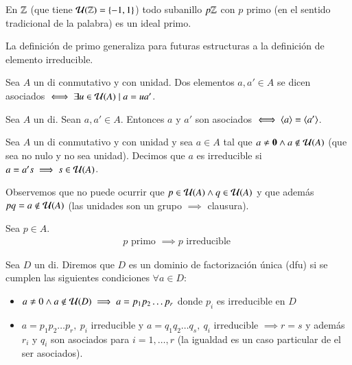 \begin{ej}
	En $\mathbb{Z}$ (que tiene $\mathcal{U}(\mathbb{Z}) = \{-1, 1\}$) todo subanillo $p\mathbb{Z}$ con $p$ primo (en el sentido tradicional de la palabra) es un ideal primo.
\end{ej}

La definición de primo generaliza para futuras estructuras a la definición de elemento irreducible.

\begin{dfn}
	Sea $A$ un \gls{di} conmutativo y con unidad. Dos elementos $a,a' \in A$ se dicen asociados $\iff \exists u \in \mathcal{U}(A) \mid a = ua'$.
\end{dfn}

\begin{pro}
	Sea $A$ un \gls{di}. Sean $a,a' \in A$. Entonces $a$ y $a'$ son asociados $\iff \langle a\rangle = \langle a'\rangle$.
\end{pro}

\begin{dfn}
	Sea $A$ un \gls{di} conmutativo y con unidad y sea $a \in A$ tal que $a \neq \mathbf{0} \land a \notin \mathcal{U}(A)$ (que sea no nulo y no sea unidad). Decimos que $a$ es irreducible si $a = a's \implies s \in \mathcal{U}(A)$.
\end{dfn}

Observemos que no puede ocurrir que $p \in \mathcal{U}(A) \land q \in \mathcal{U}(A)$ y que además $pq = a \notin \mathcal{U}(A)$ (las unidades son un grupo $\implies$ clausura).


\begin{pro}
	Sea $p \in A$.
	\begin{align*}
		p \text{ primo } \implies p \text{ irreducible }
	\end{align*}
\end{pro}

\begin{dfn}
	\label{dfn:dfu}
	Sea $D$ un \gls{di}. Diremos que $D$ es un dominio de factorización única (\gls{dfu}) si se cumplen las siguientes condiciones $\forall a \in D$:
	\begin{itemize}
		\item $a \neq 0 \land a \not\in\mathcal{U}(D) \implies a = p_1p_2\dots p_r$ donde $p_i$ es irreducible en $D$
		\item $a = p_1p_2\dots p_r,\ p_i$ irreducible y $a = q_1q_2 \dots q_s,\ q_i$ irreducible $\implies r = s$ y además $r_i$ y $q_i$ son asociados para $i = 1, \dots, r$ (la igualdad es un caso particular de el ser asociados).
	\end{itemize}
\end{dfn}

